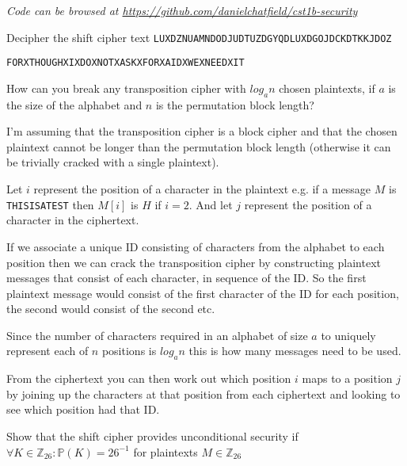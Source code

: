 \documentclass{supervision}
\begin{document}
  \emph{Code can be browsed at
  \url{https://github.com/danielchatfield/cst1b-security}}

  \begin{questions}
    \question Decipher the shift cipher text
      \lstinline|LUXDZNUAMNDODJUDTUZDGYQDLUXDGOJDCKDTKKJDOZ|

      \begin{solution}
        \lstinline|FORXTHOUGHXIXDOXNOTXASKXFORXAIDXWEXNEEDXIT|

      \end{solution}

    \question How can you break any transposition cipher with $log_a n$ chosen
      plaintexts, if $a$ is the size of the alphabet and $n$ is the permutation
      block length?

      \begin{solution}
        I'm assuming that the transposition cipher is a block cipher and
        that the chosen plaintext cannot be longer than the permutation block
        length (otherwise it can be trivially cracked with a single plaintext).

        Let $i$ represent the position of a character in the plaintext e.g. if
        a message $M$ is \lstinline|THISISATEST| then $M[i]$ is $H$ if $i=2$.
        And let $j$ represent the position of a character in the ciphertext.

        If we associate a unique ID consisting of characters from the alphabet
        to each position then we can crack the transposition cipher by
        constructing plaintext messages that consist of each character, in
        sequence of the ID. So the first plaintext message would consist of
        the first character of the ID for each position, the second would
        consist of the second etc.

        Since the number of characters required in an alphabet of size $a$ to
        uniquely represent each of $n$ positions is $log_a n$ this is how many
        messages need to be used.

        From the ciphertext you can then work out which position $i$ maps to a
        position $j$ by joining up the characters at that position from each
        ciphertext and looking to see which position had that ID.
      \end{solution}

    \question Show that the shift cipher provides unconditional security if
      $\forall K \in \mathbb{Z}_{26} : \mathbb{P}(K) = 26^{-1}$ for plaintexts
      $M \in \mathbb{Z}_{26}$


\end{questions}
\end{document}
